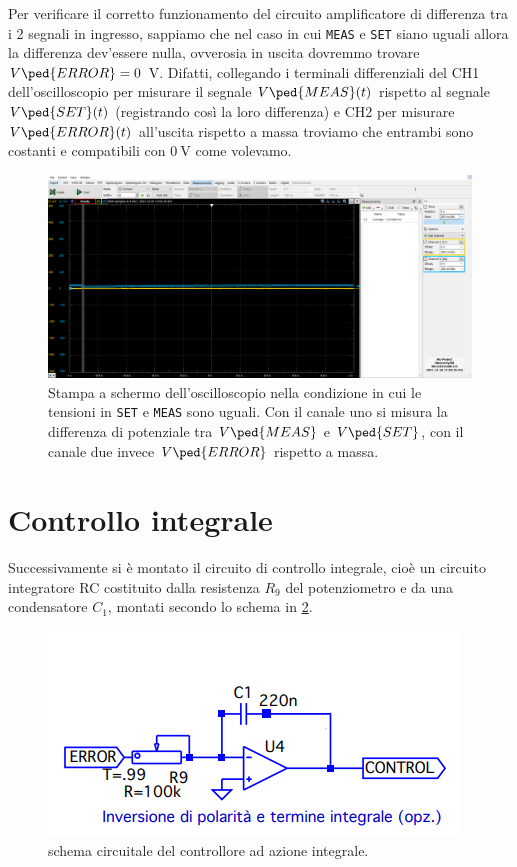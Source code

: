 \documentclass[10pt, a4paper, italian]{article}
\begin{document}
Per verificare il corretto funzionamento del circuito amplificatore di
differenza tra i 2 segnali in ingresso, sappiamo che nel caso in cui
\verb+MEAS+ e \verb+SET+ siano uguali allora la differenza dev'essere nulla,
ovverosia in uscita dovremmo trovare $V\ped{ERROR} = 0$ V.
Difatti, collegando i terminali differenziali del CH1 dell'oscilloscopio
per misurare il segnale $V\ped{MEAS} (t)$ rispetto al segnale $V\ped{SET} (t)$
(registrando così la loro differenza) e CH2 per misurare $V\ped{ERROR} (t)$
all'uscita rispetto a massa troviamo che entrambi sono costanti e compatibili
con $\SI{0}{\V}$ come volevamo.
\begin{figure}[htbp]
    \centering
	\includegraphics[width=\textwidth]{meas.same.set}
    \caption{Stampa a schermo dell'oscilloscopio nella condizione in cui le
    tensioni in \texttt{SET} e \texttt{MEAS} sono uguali. Con il canale uno
    si misura la differenza di potenziale tra $V\ped{MEAS}$ e $V\ped{SET}$,
    con il canale due invece $V\ped{ERROR}$ rispetto a massa.
    \label{fig: meas=set}}
\end{figure}

\section{Controllo integrale}
Successivamente si è montato il circuito di controllo integrale, cioè un
circuito integratore RC costituito dalla resistenza $R_9$ del potenziometro e
da una condensatore $C_1$, montati secondo lo schema in \cref{fig: ctrlint}.
\begin{figure}[htbp]
    \centering
	\includegraphics[scale=0.6]{controlgenint}
    \caption{schema circuitale del controllore ad azione integrale.
    \label{fig: ctrlint}}
\end{figure}
\end{document}
